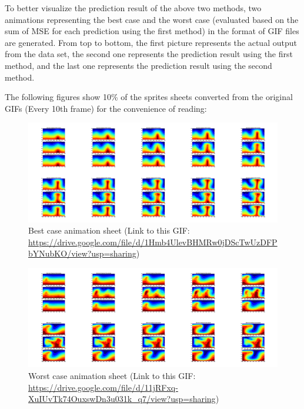 To better visualize the prediction result of the above two methods, two animations representing the best case and the worst case (evaluated based on the sum of MSE for each prediction using the first method) in the format of GIF files are generated. From top to bottom, the first picture represents the actual output from the data set, the second one represents the prediction result using the first method, and the last one represents the prediction result using the second method.

The following figures show 10\% of the sprites sheets converted from the original GIFs (Every 10th frame) for the convenience of reading:

\begin{figure}[H]
    \centering
    \caption{Best case animation sheet (Link to this GIF: \url{https://drive.google.com/file/d/1Hmb4UlevBHMRw0jDScTwUzDFPbYNubKO/view?usp=sharing})}
    \includegraphics[scale=0.10]{figures/mantle_convection_images/limited_dataset/FNN_Best_GIF_sheet.png}
\end{figure}

\begin{figure}[H]
    \centering
    \caption{Worst case animation sheet (Link to this GIF: 
    \url{https://drive.google.com/file/d/11jRFxq-XuIUvTk74OuxswDn3u031k_q7/view?usp=sharing})}
    \includegraphics[scale=0.10]{figures/mantle_convection_images/limited_dataset/FNN_Worst_GIF_sheet.png}
\end{figure}

